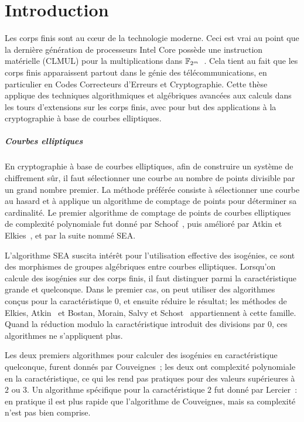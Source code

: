 \chapter*{Introduction}

Les corps finis sont au cœur de la technologie moderne. Ceci est vrai
au point que la dernière génération de processeurs Intel Core possède
une instruction matérielle (CLMUL) pour la multiplications dans
$\mathbb{F}_{2^m}$~\cite{intel-carryless}. Cela tient au fait que les corps
finis apparaissent partout dans le génie des télécommunications, en
particulier en Codes Correcteurs d'Erreurs et Cryptographie. Cette
thèse applique des techniques algorithmiques et algébriques avancées
aux calculs dans les tours d'extensions sur les corps finis, avec pour
but des applications à la cryptographie à base de courbes elliptiques.

\paragraph*{Courbes elliptiques}
En cryptographie à base de courbes elliptiques, afin de construire un
système de chiffrement sûr, il faut sélectionner une courbe au nombre
de points divisible par un grand nombre premier. La méthode préférée
consiste à sélectionner une courbe au hasard et à applique un
algorithme de comptage de points pour déterminer sa cardinalité. Le
premier algorithme de comptage de points de courbes elliptiques de
complexité polynomiale fut donné par Schoof~\cite{schoof85}, puis
amélioré par Atkin et
Elkies~\cite{atkin88,elkies92,elkies98,schoof95}, et par la suite
nommé SEA.

L'algorithme SEA suscita intérêt pour l'utilisation effective des
isogénies, ce sont des morphismes de groupes algébriques entre courbes
elliptiques. Lorsqu'on calcule des isogénies sur des corps finis, il
faut distinguer parmi la caractéristique grande et quelconque. Dans le
premier cas, on peut utiliser des algorithmes conçus pour la
caractéristique $0$, et ensuite réduire le résultat; les méthodes de
Elkies\cite{elkies98,morain95}, Atkin~\cite{schoof95} et Bostan,
Morain, Salvy et Schost~\cite{bostan+morain+salvy+schost08}
appartiennent à cette famille. Quand la réduction modulo la
caractéristique introduit des divisions par $0$, ces algorithmes ne
s'appliquent plus.

Les deux premiers algorithmes pour calculer des isogénies en
caractéristique quelconque, furent donnés par
Couveignes~\cite{couveignes94,couveignes96}; les deux ont complexité
polynomiale en la caractéristique, ce qui les rend pas pratiques pour
des valeurs supérieures à $2$ ou $3$. Un algorithme spécifique pour la
caractéristique $2$ fut donné par Lercier~\cite{lercier96}: en
pratique il est plus rapide que l'algorithme de Couveignes, mais sa
complexité n'est pas bien comprise.

